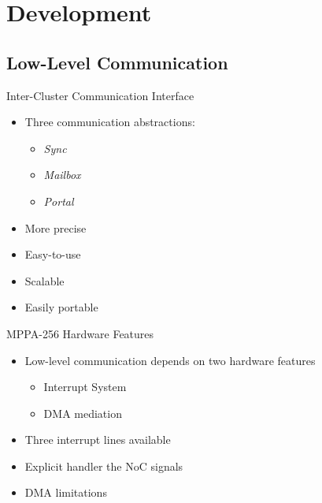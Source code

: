 \section{Development}

	\subsection{Low-Level Communication}

		\begin{frame}[fragile]{Inter-Cluster Communication Interface}

			\begin{itemize}
				\item Three communication abstractions:
				\begin{itemize}
					\item \textit{Sync}
					\item \textit{Mailbox}
					\item \textit{Portal}
				\end{itemize}
				\item More precise
				\item Easy-to-use
				\item Scalable
				\item Easily portable
			\end{itemize}

		\end{frame}

		\begin{frame}[fragile]{MPPA-256 Hardware Features}
			\begin{itemize}
				\item Low-level communication depends on two hardware features
				\begin{itemize}
					\item Interrupt System
					\item DMA mediation
				\end{itemize}
				\item Three interrupt lines available
				\item Explicit handler the NoC signals %
				\item DMA limitations
			\end{itemize}
		\end{frame}

